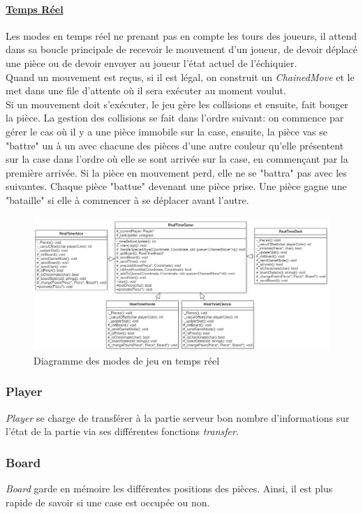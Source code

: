 \documentclass[10pt, a4paper]{article}
\begin{document}
\paragraph{\underline{Temps Réel}}
Les modes en temps réel ne prenant pas en compte les tours des joueurs, il attend dans sa boucle principale de recevoir le mouvement d'un joueur, de devoir déplacé une pièce ou de devoir envoyer au joueur l'état actuel de l'échiquier. \\
Quand un mouvement est reçus, si il est légal, on construit un \textit{ChainedMove} et le met dans une file d'attente où il sera exécuter au moment voulut. \\
Si un mouvement doit s'exécuter, le jeu gère les collisions et ensuite, fait bouger la pièce. La gestion des collisions se fait dans l'ordre suivant: on commence par gérer le cas où il y a une pièce immobile sur la case, ensuite, la pièce vas se "battre" un à un avec chacune des pièces d'une autre couleur qu'elle présentent sur la case dans l'ordre où elle se sont arrivée sur la case, en commençant par la première arrivée. Si la pièce en mouvement perd, elle ne se "battra" pas avec les suivantes. Chaque pièce "battue" devenant une pièce prise. Une pièce gagne une "bataille" si elle à commencer à se déplacer avant l'autre.
\begin{figure}[H]
\centering
\includegraphics[scale=0.5]{mode_chess_realtime.png}
\caption{Diagramme des modes de jeu en temps réel}
\end{figure}



\subsubsection{Player}
\textit{Player} se charge de transférer à la partie serveur bon nombre d'informations sur l'état de la partie via ses différentes fonctions \textit{transfer}.

\subsubsection{Board}
\textit{Board} garde en mémoire les différentes positions des pièces. Ainsi, il est plus rapide de savoir si une case est occupée ou non.
\end{document}
